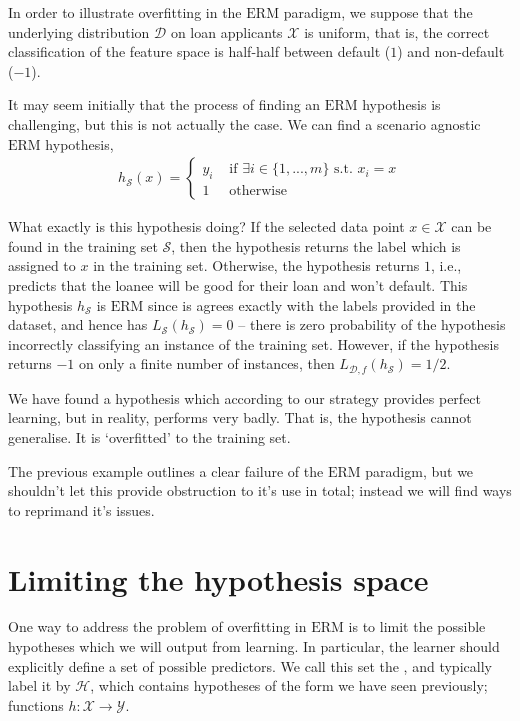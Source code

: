 \begin{example}
	In order to illustrate overfitting in the $ \mathrm{ERM} $ paradigm, we suppose that the underlying distribution $ \mathcal{D} $ on loan applicants $ \mathcal{X} $ is uniform, that is, the correct classification of the feature space is half-half between default ($ 1 $) and non-default ($ -1 $).

	It may seem initially that the process of finding an $ \mathrm{ERM} $ hypothesis is challenging, but this is not actually the case. We can find a scenario agnostic $ \mathrm{ERM} $ hypothesis,
	\begin{align*}
		h_{\mathcal{S}}( x ) = \begin{cases}
			                       y_{i} & \text{ if } \exists i \in \{ 1,...,m \} \text{ s.t. } x_{i} = x \\
			                       1     & \text{ otherwise }
		                       \end{cases}
	\end{align*}

	What exactly is this hypothesis doing? If the selected data point $ x \in \mathcal{X} $ can be found in the training set $ \mathcal{S} $, then the hypothesis returns the label which is assigned to $ x $ in the training set. Otherwise, the hypothesis returns $ 1 $, i.e., predicts that the loanee will be good for their loan and won't default. This hypothesis $ h_{\mathcal{S}} $ is $ \mathrm{ERM} $ since is agrees exactly with the labels provided in the dataset, and hence has $ L_{\mathcal{S}}( h_{\mathcal{S}} ) = 0 $ -- there is zero probability of the hypothesis incorrectly classifying an instance of the training set. However, if the hypothesis returns $ -1 $ on only a finite number of instances, then $ L_{\mathcal{D}, f}( h_{\mathcal{S}} ) = 1/2 $.

	We have found a hypothesis which according to our strategy provides perfect learning, but in reality, performs very badly. That is, the hypothesis cannot generalise. It is `overfitted' to the training set.
\end{example}

The previous example outlines a clear failure of the $ \mathrm{ERM} $ paradigm, but we shouldn't let this provide obstruction to it's use in total; instead we will find ways to reprimand it's issues.

\section{Limiting the hypothesis space}
One way to address the problem of overfitting in $ \mathrm{ERM} $ is to limit the possible hypotheses which we will output from learning. In particular, the learner should explicitly define a set of possible predictors. We call this set the , and typically label it by $ \mathcal{H} $, which contains hypotheses of the form we have seen previously; functions $ h: \mathcal{X} \to \mathcal{Y} $.

